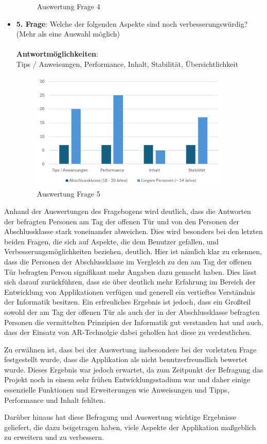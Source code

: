 \begin{itemize}
\begin{figure}[H]
        \caption{Auswertung Frage 4}
        \label{fig:fr1}
    \end{figure}
    \item \textbf{5. Frage}: Welche der folgenden Aspekte sind noch verbesserungswürdig? (Mehr als eine Auswahl möglich)
    \\
    \\
    \textbf{Antwortmöglichkeiten}:\\
    Tips / Anweisungen, Performance, Inhalt, Stabilität, Übersichtlichkeit
    \\
    \begin{figure}[H]
        \centering
        \includegraphics[width=0.9\textwidth]{images/AuswertungFrage5}
        \caption{Auswertung Frage 5}
        \label{fig:fr1}
    \end{figure}
\end{itemize}

Anhand der Auswertungen des Fragebogens wird deutlich, dass die Antworten der befragten Personen am Tag der offenen Tür
und von den Personen der Abschlussklasse stark voneinander abweichen. Dies wird besonders bei den letzten beiden Fragen,
die sich auf Aspekte, die dem Benutzer gefallen, und Verbesserungsmöglichkeiten beziehen, deutlich. Hier ist nämlich klar
zu erkennen, dass die Personen der Abschlussklasse im Vergleich zu den am Tag der offenen Tür befragten Person signifikant
mehr Angaben dazu gemacht haben. Dies lässt sich darauf zurückführen, dass sie über deutlich mehr Erfahrung im Bereich
der Entwicklung von Applikationen verfügen und generell ein vertieftes Verständnis der Informatik besitzen. Ein erfreuliches
Ergebnis ist jedoch, dass ein Großteil sowohl der am Tag der offenen Tür als auch der in der Abschlussklasse
befragten Personen die vermittelten Prinzipien der Informatik gut verstanden hat und auch, dass der Einsatz von AR-Technolgie
dabei geholfen hat diese zu verdeutlichen.

Zu erwähnen ist, dass bei der Auswertung insbesondere bei der vorletzten Frage festgestellt wurde, dass die Applikation
als nicht benutzerfreundlich bewertet wurde. Dieses Ergebnis war jedoch erwartet, da zum Zeitpunkt der Befragung das
Projekt noch in einem sehr frühen Entwicklungsstadium war und daher einige essenzielle Funktionen und Erweiterungen wie
Anweisungen und Tipps, Performance und Inhalt fehlten.

Darüber hinaus hat diese Befragung und Auswertung wichtige Ergebnisse geliefert, die dazu beigetragen haben, viele Aspekte
der Applikation maßgeblich zu erweitern und zu verbessern.